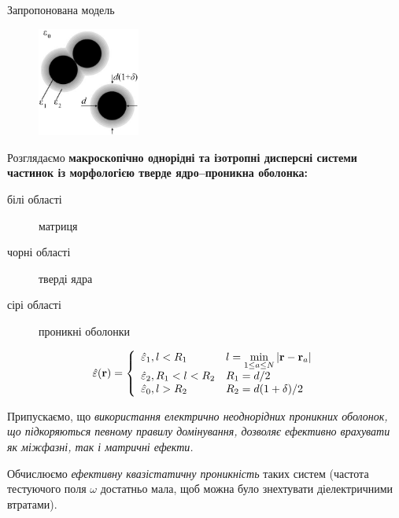 \documentclass[10pt]{beamer}
\begin{document}
\begin{frame}{Запропонована модель}

\begin{figure}
\vspace{-25pt}
  \begin{center}
    \includegraphics[width=0.3\textwidth]{images/particles-pen.eps}
  \end{center}
\vspace{-25pt}
\end{figure}
    
Розглядаємо \textbf{макроскопічно однорідні та ізотропні дисперсні системи частинок із морфологією тверде ядро--проникна оболонка:}

\footnotesize
\begin{description}
  \item[білі області] матриця 
  \item[чорні області] тверді ядра
  \item[сірі області] проникні оболонки 
\end{description}
$$
    \hat{\varepsilon}({\bf r}) = \left\{ \begin{array}{ll}
    \hat{\varepsilon}_1, l<R_1 & l = \min\limits_{1 \leq a \leq N} |{\bf r} - {\bf r}_a| \\
    \hat{\varepsilon}_2, R_1 < l < R_2 & R_1 = d/2 \\
    \hat{\varepsilon}_0, l > R_2 & R_2 = d(1+\delta)/2
    \end{array}    
    \right. \vspace{5pt}
$$

Припускаємо, що \textit{використання електрично неоднорідних проникних оболонок, що підкоряються певному правилу домінування, дозволяє ефективно врахувати як міжфазні, так і матричні ефекти.}


Обчислюємо \textit{ефективну квазістатичну проникність} таких систем (частота тестуючого поля $\omega$ достатньо мала, щоб можна було знехтувати діелектричними втратами). 


\end{frame}
\end{document}
